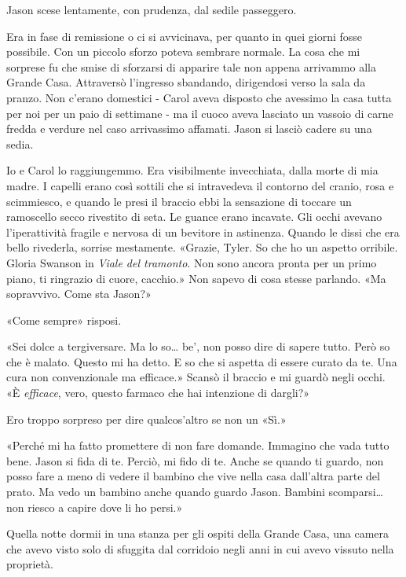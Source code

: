 Jason scese lentamente, con prudenza, dal sedile passeggero.

Era in fase di remissione o ci si avvicinava, per quanto in quei giorni
fosse possibile. Con un piccolo sforzo poteva sembrare normale. La cosa
che mi sorprese fu che smise di sforzarsi di apparire tale non appena
arrivammo alla Grande Casa. Attraversò l'ingresso sbandando, dirigendosi
verso la sala da pranzo. Non c'erano domestici - Carol aveva disposto
che avessimo la casa tutta per noi per un paio di settimane - ma il
cuoco aveva lasciato un vassoio di carne fredda e verdure nel caso
arrivassimo affamati. Jason si lasciò cadere su una sedia.

Io e Carol lo raggiungemmo. Era visibilmente invecchiata, dalla morte di
mia madre. I capelli erano così sottili che si intravedeva il contorno
del cranio, rosa e scimmiesco, e quando le presi il braccio ebbi la
sensazione di toccare un ramoscello secco rivestito di seta. Le guance
erano incavate. Gli occhi avevano l'iperattività fragile e nervosa di un
bevitore in astinenza. Quando le dissi che era bello rivederla, sorrise
mestamente. «Grazie, Tyler. So che ho un aspetto orribile. Gloria
Swanson in \emph{Viale del tramonto}. Non sono ancora pronta per un
primo piano, ti ringrazio di cuore, cacchio.» Non sapevo di cosa stesse
parlando. «Ma sopravvivo. Come sta Jason?»

«Come sempre» risposi.

«Sei dolce a tergiversare. Ma lo so\ldots{} be', non posso dire di
sapere tutto. Però so che è malato. Questo mi ha detto. E so che si
aspetta di essere curato da te. Una cura non convenzionale ma efficace.»
Scansò il braccio e mi guardò negli occhi. «È \emph{efficace}, vero,
questo farmaco che hai intenzione di dargli?»

Ero troppo sorpreso per dire qualcos'altro se non un «Sì.»

«Perché mi ha fatto promettere di non fare domande. Immagino che vada
tutto bene. Jason si fida di te. Perciò, mi fido di te. Anche se quando
ti guardo, non posso fare a meno di vedere il bambino che vive nella
casa dall'altra parte del prato. Ma vedo un bambino anche quando guardo
Jason. Bambini scomparsi\ldots{} non riesco a capire dove li ho persi.»

\separatorefiori

Quella notte dormii in una stanza per gli ospiti della Grande Casa, una
camera che avevo visto solo di sfuggita dal corridoio negli anni in cui
avevo vissuto nella proprietà.

